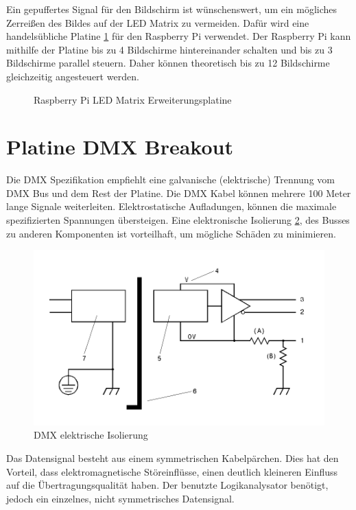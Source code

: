 Ein gepuffertes Signal für den Bildschirm ist wünschenswert, um ein mögliches Zerreißen des Bildes auf der LED Matrix zu vermeiden. Dafür wird eine handelsübliche Platine \ref{fig:led_matrix_steuer_platine} für den Raspberry Pi verwendet. Der Raspberry Pi kann mithilfe der Platine bis zu 4 Bildschirme hintereinander schalten und bis zu 3 Bildschirme parallel steuern. Daher können theoretisch bis zu 12 Bildschirme gleichzeitig angesteuert werden.

\begin{figure}[H]
	\centering
	\caption{Raspberry Pi LED Matrix Erweiterungsplatine}
	\cite[S.1]{JoyItLedMatrix}
	\label{fig:led_matrix_steuer_platine}
\end{figure}

\section{Platine DMX Breakout}

Die DMX Spezifikation empfiehlt eine galvanische (elektrische) Trennung vom DMX Bus und dem Rest der Platine\cite[S.22]{DMX512-Protocol-Standard}. Die DMX Kabel können mehrere 100 Meter lange Signale weiterleiten. Elektrostatische Aufladungen, können die maximale spezifizierten Spannungen übersteigen. Eine elektronische Isolierung \ref{fig:DmxIsolation}, des Busses zu anderen Komponenten ist vorteilhaft, um mögliche Schäden zu minimieren.

\begin{figure}[H]
	\centering
	\includegraphics[width=0.5\linewidth]{Pictures/DmxIsolation}
	\caption{DMX elektrische Isolierung \cite[S.22]{DMX512-Protocol-Standard}}
	\label{fig:DmxIsolation}
\end{figure}

Das Datensignal  besteht aus einem symmetrischen Kabelpärchen. Dies hat den Vorteil, dass elektromagnetische Störeinflüsse, einen deutlich kleineren Einfluss auf die Übertragungsqualität haben. Der benutzte Logikanalysator benötigt, jedoch ein einzelnes, nicht symmetrisches Datensignal.

